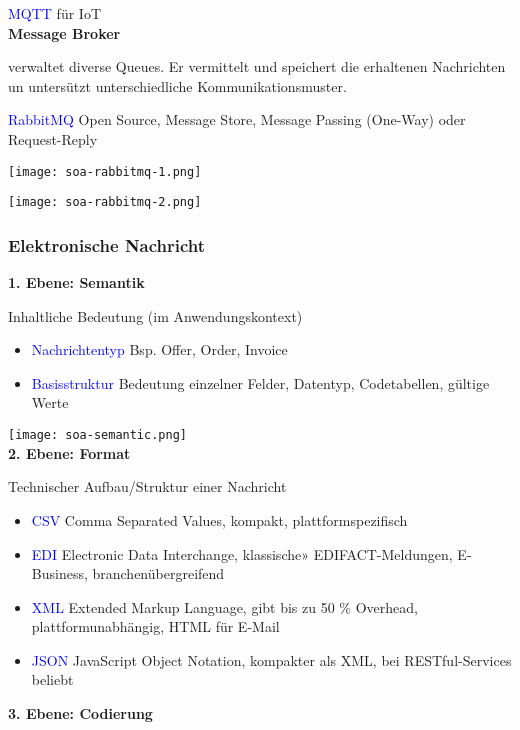 \textcolor{blue}{MQTT} für IoT \\

\textbf{Message Broker}

verwaltet diverse Queues. Er vermittelt und speichert die erhaltenen Nachrichten un untersützt unterschiedliche Kommunikationsmuster.

\textcolor{blue}{RabbitMQ} Open Source, Message Store, Message Passing (One-Way) oder Request-Reply

\texttt{[image: soa-rabbitmq-1.png]}

\texttt{[image: soa-rabbitmq-2.png]}


\subsubsection{Elektronische Nachricht}

\textbf{1. Ebene: Semantik}

Inhaltliche Bedeutung (im Anwendungskontext)

\begin{itemize}
    \item \textcolor{blue}{Nachrichtentyp} Bsp. Offer, Order, Invoice
    \item \textcolor{blue}{Basisstruktur} Bedeutung einzelner Felder, Datentyp, Codetabellen, gültige Werte
\end{itemize}

\texttt{[image: soa-semantic.png]} \\


\textbf{2. Ebene: Format}

Technischer Aufbau/Struktur einer Nachricht

\begin{itemize}
    \item \textcolor{blue}{CSV} Comma Separated Values, kompakt, plattformspezifisch
    \item \textcolor{blue}{EDI} Electronic Data Interchange, klassische» EDIFACT-Meldungen, E-Business, branchenübergreifend
    \item \textcolor{blue}{XML} Extended Markup Language, gibt bis zu 50 \% Overhead, plattformunabhängig, HTML für E-Mail
    \item \textcolor{blue}{JSON} JavaScript Object Notation, kompakter als XML, bei RESTful-Services beliebt
\end{itemize}
\vspace{10pt}
\textbf{3. Ebene: Codierung}

